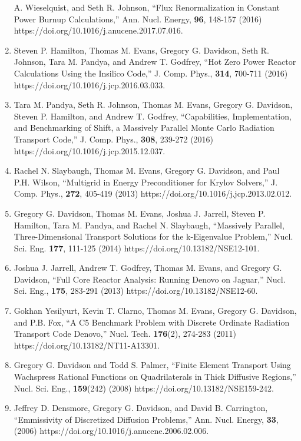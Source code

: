 \documentclass[letterpaper,11pt]{article}
\begin{document}
\begin{enumerate}
    A. Wieselquist, and Seth R. Johnson, ``Flux Renormalization in
    Constant Power Burnup Calculations,'' Ann. Nucl. Energy,
    \textbf{96}, 148-157 (2016)
    https://doi.org/10.1016/j.anucene.2017.07.016.
  \item Steven P. Hamilton, Thomas M. Evans, Gregory G. Davidson, Seth
    R. Johnson, Tara M. Pandya, and Andrew T. Godfrey, ``Hot Zero
    Power Reactor Calculations Using the Insilico Code,''
    J. Comp. Phys., \textbf{314}, 700-711 (2016)
    https://doi.org/10.1016/j.jcp.2016.03.033.
  \item Tara M. Pandya, Seth R. Johnson, Thomas M. Evans, Gregory
    G. Davidson, Steven P. Hamilton, and Andrew T. Godfrey, ``Capabilities,
    Implementation, and Benchmarking of Shift, a Massively Parallel
    Monte Carlo Radiation Transport Code,'' J. Comp. Phys.,
    \textbf{308}, 239-272 (2016)
    https://doi.org/10.1016/j.jcp.2015.12.037.
  \item Rachel N. Slaybaugh, Thomas M. Evans, Gregory G. Davidson, and
    Paul P.H. Wilson, ``Multigrid in Energy Preconditioner for Krylov
    Solvers,'' J. Comp. Phys., \textbf{272}, 405-419 (2013)
    https://doi.org/10.1016/j.jcp.2013.02.012.
  \item Gregory G. Davidson, Thomas M. Evans, Joshua J. Jarrell,
    Steven P. Hamilton, Tara M. Pandya, and Rachel N. Slaybaugh, ``Massively
    Parallel, Three-Dimensional Transport Solutions for the
    k-Eigenvalue Problem,'' Nucl. Sci. Eng. \textbf{177}, 111-125
    (2014) https://doi.org/10.13182/NSE12-101.
  \item Joshua J. Jarrell, Andrew T. Godfrey, Thomas M. Evans, and
    Gregory G. Davidson, ``Full Core Reactor Analysis: Running Denovo
    on Jaguar,'' Nucl. Sci. Eng., \textbf{175}, 283-291 (2013)
    https://doi.org/10.13182/NSE12-60.
  \item Gokhan Yesilyurt, Kevin T. Clarno, Thomas M. Evans, Gregory
    G. Davidson, and P.B. Fox, ``A C5 Benchmark Problem with Discrete
    Ordinate Radiation Transport Code Denovo,''
    Nucl. Tech. \textbf{176}(2), 274-283 (2011)
    https://doi.org/10.13182/NT11-A13301.
  \item Gregory G. Davidson and Todd S. Palmer, ``Finite Element
    Transport Using Wachspress Rational Functions on Quadrilaterals in
    Thick Diffusive Regions,'' Nucl. Sci. Eng., \textbf{159}(242)
    (2008) https://doi.org/10.13182/NSE159-242.
  \item Jeffrey D. Densmore, Gregory G. Davidson, and David
    B. Carrington, ``Emmissivity of Discretized Diffusion Problems,''
    Ann. Nucl. Energy, \textbf{33}, (2006)
    https://doi.org/10.1016/j.anucene.2006.02.006.
\end{enumerate}
\end{document}
